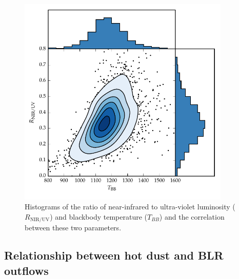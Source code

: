 \begin{figure}[t!]
  \centering
  \includegraphics[width=0.9\textwidth]{figures/chapter05/ratio_tbb_density.pdf}
  \caption[{Histograms of the ratio of near-infrared to ultra-violet luminosity and blackbody temperature and the correlation between these two parameters.}]{Histograms of the ratio of near-infrared to ultra-violet luminosity ($R_{\text{NIR/UV}}$) and blackbody temperature ($T_{BB}$) and the correlation between these two parameters. }
  \label{fig:ratio_tbb_density}
\end{figure}

\subsection{Relationship between hot dust and BLR outflows}

